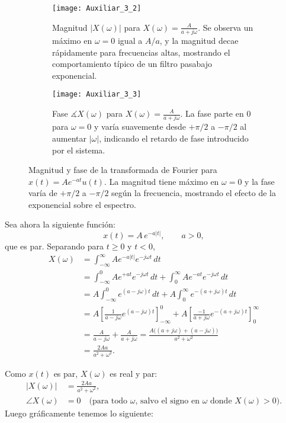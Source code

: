 \documentclass[
  11pt,
  letterpaper,
   addpoints,
   answers
  ]{exam}
\begin{document}
\begin{questions}
\begin{solution}
\begin{figure}[H]
  \begin{subfigure}[t]{0.48\textwidth}
    \centering
    \texttt{[image: Auxiliar\_3\_2]} %
    \caption{Magnitud $|X(\omega)|$ para $X(\omega)=\frac{A}{a+j\omega}$. Se observa un máximo en $\omega=0$ igual a $A/a$, y la magnitud decae rápidamente para frecuencias altas, mostrando el comportamiento típico de un filtro pasabajo exponencial.}
    \label{fig:mag_XF1}
  \end{subfigure}
  \hfill
  \begin{subfigure}[t]{0.48\textwidth}
    \centering
    \texttt{[image: Auxiliar\_3\_3]}
    \caption{Fase $\measuredangle X(\omega)$ para $X(\omega)=\frac{A}{a+j\omega}$. La fase parte en $0$ para $\omega=0$ y varía suavemente desde $+\pi/2$ a $-\pi/2$ al aumentar $|\omega|$, indicando el retardo de fase introducido por el sistema.}
    \label{fig:fase_XF}
  \end{subfigure}

  \caption{Magnitud y fase de la transformada de Fourier para $x(t)=A e^{-a t}u(t)$. La magnitud tiene máximo en $\omega=0$ y la fase varía de $+\pi/2$ a $-\pi/2$ según la frecuencia, mostrando el efecto de la exponencial sobre el espectro.}
  \label{fig:mag_fase_XF}
\end{figure}


Sea ahora la siguiente función:
\begin{equation}
x(t)=A\,e^{-a|t|},\qquad a>0,
\end{equation}
que es par. Separando para \(t\ge 0\) y \(t<0\),
\begin{align}
X(\omega)
 &= \int_{-\infty}^{\infty} A e^{-a|t|} e^{-j\omega t}\,dt \\
 &= \int_{-\infty}^{0} A e^{+a t} e^{-j\omega t}\,dt
   + \int_{0}^{\infty} A e^{-a t} e^{-j\omega t}\,dt \\
 &= A\int_{-\infty}^{0} e^{(a-j\omega)t}\,dt
   +A\int_{0}^{\infty} e^{-(a+j\omega)t}\,dt \\
 &= A\left[\frac{1}{a-j\omega}e^{(a-j\omega)t}\right]_{-\infty}^{0}
   +A\left[\frac{-1}{a+j\omega}e^{-(a+j\omega)t}\right]_{0}^{\infty} \\
 &= \frac{A}{a-j\omega}+\frac{A}{a+j\omega}
  = \frac{A\big((a+j\omega)+(a-j\omega)\big)}{a^{2}+\omega^{2}} \\
 &= \frac{2A a}{a^{2}+\omega^{2}}.
\end{align}

Como \(x(t)\) es par, \(X(\omega)\) es real y par:
\begin{align}
|X(\omega)|
  &= \frac{2A a}{a^{2}+\omega^{2}},\\
\angle X(\omega)
  &= 0\quad \text{(para todo \(\omega\), salvo el signo en \(\omega\) donde \(X(\omega)>0\))}.
\end{align}
Luego gráficamente tenemos lo siguiente:
\begin{figure}[H]
  \centering


\end{figure}
\end{solution}
\end{questions}
\end{document}
